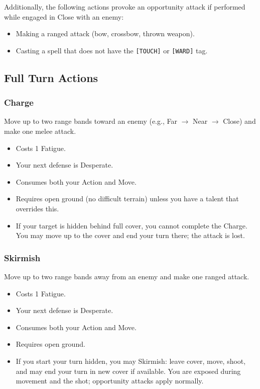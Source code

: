 Additionally, the following actions provoke an opportunity attack if performed while engaged in Close with an enemy:
\begin{itemize}
  \item Making a ranged attack (bow, crossbow, thrown weapon).
  \item Casting a spell that does not have the \texttt{[TOUCH]} or \texttt{[WARD]} tag.
\end{itemize}

\subsection{Full Turn Actions}

\subsubsection{Charge}
Move up to two range bands toward an enemy (e.g., Far $\rightarrow$ Near $\rightarrow$ Close) and make one melee attack.
\begin{itemize}
  \item Costs 1 Fatigue.
  \item Your next defense is Desperate.
  \item Consumes both your Action and Move.
  \item Requires open ground (no difficult terrain) unless you have a talent that overrides this.
  \item If your target is hidden behind full cover, you cannot complete the Charge. You may move up to the cover and end your turn there; the attack is lost.
\end{itemize}

\subsubsection{Skirmish}
Move up to two range bands away from an enemy and make one ranged attack.
\begin{itemize}
  \item Costs 1 Fatigue.
  \item Your next defense is Desperate.
  \item Consumes both your Action and Move.
  \item Requires open ground.
  \item If you start your turn hidden, you may Skirmish: leave cover, move, shoot, and may end your turn in new cover if available. You are exposed during movement and the shot; opportunity attacks apply normally.
\end{itemize}

